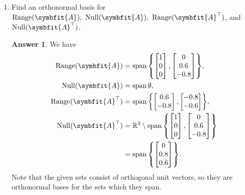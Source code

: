 \documentclass{article}
\theoremstyle{definition}
\newtheorem*{answer}{Answer}
\newcommand{\reals}{\mathbb{R}}
\newcommand{\mat}[1]{\symbfit{#1}}
\DeclareMathOperator{\range}{Range}
\DeclareMathOperator{\nullsp}{Null}
\DeclareMathOperator{\spn}{span}
\begin{document}
\begin{enumerate}[leftmargin=\labelsep]
\begin{enumerate}
		      \item Find an orthonormal basis for \(\range(\mat{A}),\ \nullsp(\mat{A}),\ \range(\mat{A}^\top)\), and \(\nullsp(\mat{A}^\top)\).
		            \begin{answer}
			            We have
			            \begin{alignat*}{4}
				            \range(\mat{A})       & = \spn \qty{\begin{bmatrix}1\\ 0\\ 0\end{bmatrix}, \begin{bmatrix} 0\\ 0.6\\ -0.8\end{bmatrix}},                   \\
				            \nullsp(\mat{A})      & = \spn \emptyset,                                                                                                  \\
				            \range(\mat{A}^\top)  & = \spn \qty{\begin{bmatrix}0.6\\ -0.8\end{bmatrix}, \begin{bmatrix}-0.8\\ -0.6\end{bmatrix}},                      \\
				            \nullsp(\mat{A}^\top) & = \reals^3 \setminus \spn \qty{\begin{bmatrix}1\\ 0\\ 0\end{bmatrix}, \begin{bmatrix} 0\\ 0.6\\ -0.8\end{bmatrix}} \\
				                                  & = \spn \qty{\begin{bmatrix} 0\\ 0.8\\ 0.6\end{bmatrix}}.
			            \end{alignat*}
			            Note that the given sets consist of orthogonal unit vectors, so they are orthonormal bases for the sets which they span.
		            \end{answer}


\end{enumerate}
\end{enumerate}
\end{document}
